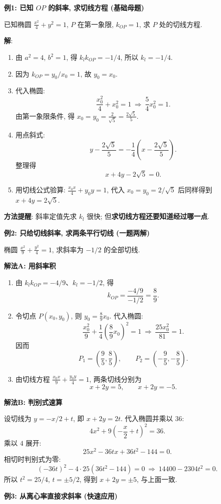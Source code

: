 \begin{examplebox}
\textbf{例1: 已知 $OP$ 的斜率, 求切线方程 (基础母题)}

已知椭圆 $\frac{x^2}{4}+y^2=1$, $P$ 在第一象限,
$k_{OP}=1$, 求 $P$ 处的切线方程.

\textbf{解}:
\begin{enumerate}
  \item 由 $a^2=4$, $b^2=1$, 得
  $k_lk_{OP}=-1/4$, 所以 $k_l=-1/4$.
  \item 因为 $k_{OP}=y_0/x_0=1$, 故 $y_0=x_0$.
  \item 代入椭圆:
  \[
  \frac{x_0^2}{4}+x_0^2=1
  \ \Longrightarrow\ \frac54x_0^2=1.
  \]
  由第一象限条件, 得
  $x_0=y_0=\frac2{\sqrt5}=\frac{2\sqrt5}{5}$.
  \item 用点斜式:
  \[
  y-\frac{2\sqrt5}{5}
  =-\frac14\left(x-\frac{2\sqrt5}{5}\right).
  \]
  整理得
  \[
  \boxed{x+4y-2\sqrt5=0.}
  \]
  \item 用切线公式验算:
  $\frac{x_0x}{4}+y_0y=1$,
  代入 $x_0=y_0=2/\sqrt5$ 后同样得到 $x+4y=2\sqrt5$.
\end{enumerate}
\textbf{方法提醒}: 斜率定值先求 $k_l$ 很快;
但\textbf{求切线方程还要知道经过哪一点}.

\medskip
\textbf{例2: 只给切线斜率, 求两条平行切线 (一题两解)}

椭圆 $\frac{x^2}{9}+\frac{y^2}{4}=1$, 求斜率为 $-1/2$ 的全部切线.

\textbf{解法A: 用斜率积}
\begin{enumerate}
  \item 由 $k_lk_{OP}=-4/9$、$k_l=-1/2$, 得
  \[
  k_{OP}=\frac{-4/9}{-1/2}=\frac89.
  \]
  \item 令切点 $P(x_0,y_0)$, 则 $y_0=\frac89x_0$.
  代入椭圆:
  \[
  \frac{x_0^2}{9}+\frac1{4}\left(\frac89x_0\right)^2=1
  \ \Longrightarrow\ \frac{25x_0^2}{81}=1.
  \]
  因而
  \[
  P_1=\left(\frac95,\frac85\right),\qquad
  P_2=\left(-\frac95,-\frac85\right).
  \]
  \item 由切线方程 $\frac{x_0x}{9}+\frac{y_0y}{4}=1$,
  两条切线分别为
  \[
  \boxed{x+2y=5},\qquad \boxed{x+2y=-5}.
  \]
\end{enumerate}
\textbf{解法B: 判别式速算}

设切线为 $y=-x/2+t$, 即 $x+2y=2t$.
代入椭圆并乘以 $36$:
\[
4x^2+9\left(-\frac x2+t\right)^2=36.
\]
乘以 $4$ 展开:
\[
25x^2-36tx+36t^2-144=0.
\]
相切时判别式为零:
\[
(-36t)^2-4\cdot25(36t^2-144)=0
\ \Longrightarrow\ 14400-2304t^2=0.
\]
所以 $t^2=25/4$, $t=\pm5/2$,
得到 $x+2y=\pm5$, 与上面一致.

\medskip
\textbf{例3: 从离心率直接求斜率 (快速应用)}


\end{examplebox}
